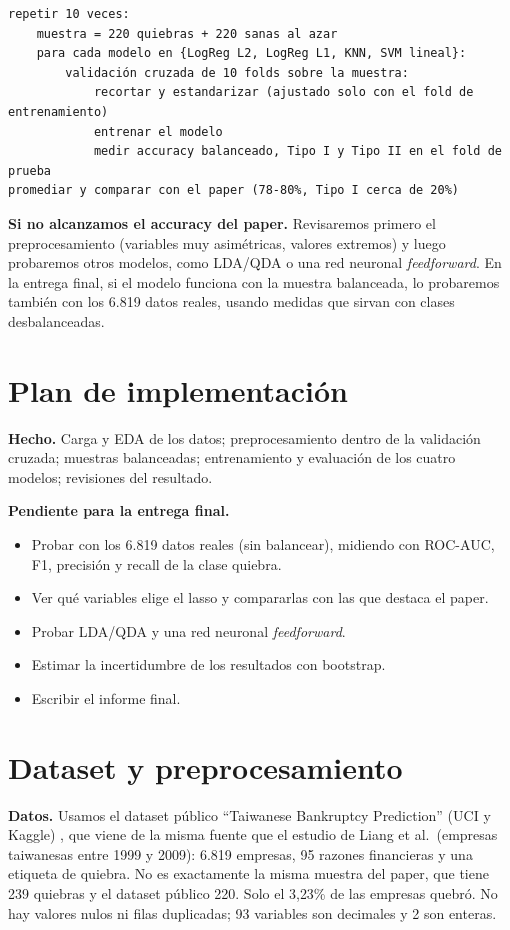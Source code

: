 \documentclass[11pt,a4paper]{article}
\begin{document}
\begin{verbatim}
repetir 10 veces:
    muestra = 220 quiebras + 220 sanas al azar
    para cada modelo en {LogReg L2, LogReg L1, KNN, SVM lineal}:
        validación cruzada de 10 folds sobre la muestra:
            recortar y estandarizar (ajustado solo con el fold de entrenamiento)
            entrenar el modelo
            medir accuracy balanceado, Tipo I y Tipo II en el fold de prueba
promediar y comparar con el paper (78-80%, Tipo I cerca de 20%)
\end{verbatim}

\textbf{Si no alcanzamos el accuracy del paper.} Revisaremos primero el preprocesamiento (variables muy asimétricas, valores extremos) y luego probaremos otros modelos, como LDA/QDA o una red neuronal \textit{feedforward}. En la entrega final, si el modelo funciona con la muestra balanceada, lo probaremos también con los 6.819 datos reales, usando medidas que sirvan con clases desbalanceadas.

\section{Plan de implementación}

\textbf{Hecho.} Carga y EDA de los datos; preprocesamiento dentro de la validación cruzada; muestras balanceadas; entrenamiento y evaluación de los cuatro modelos; revisiones del resultado.

\textbf{Pendiente para la entrega final.}
\begin{itemize}[leftmargin=1.5em]
    \item Probar con los 6.819 datos reales (sin balancear), midiendo con ROC-AUC, F1, precisión y recall de la clase quiebra.
    \item Ver qué variables elige el lasso y compararlas con las que destaca el paper.
    \item Probar LDA/QDA y una red neuronal \textit{feedforward}.
    \item Estimar la incertidumbre de los resultados con bootstrap.
    \item Escribir el informe final.
\end{itemize}

\section{Dataset y preprocesamiento}

\textbf{Datos.} Usamos el dataset público ``Taiwanese Bankruptcy Prediction'' (UCI y Kaggle) \citep{uci572}, que viene de la misma fuente que el estudio de Liang et al.\ (empresas taiwanesas entre 1999 y 2009): 6.819 empresas, 95 razones financieras y una etiqueta de quiebra. No es exactamente la misma muestra del paper, que tiene 239 quiebras y el dataset público 220. Solo el 3{,}23\% de las empresas quebró. No hay valores nulos ni filas duplicadas; 93 variables son decimales y 2 son enteras.
\end{document}
